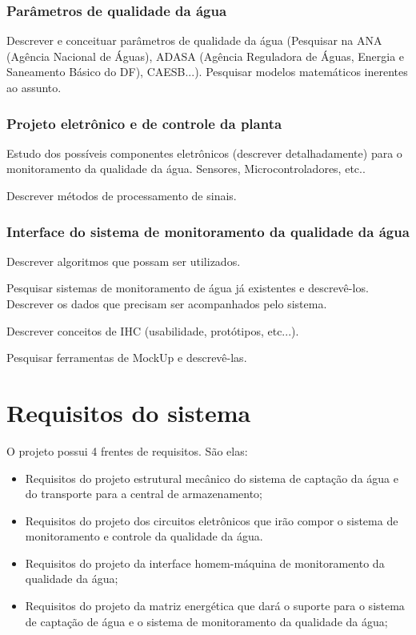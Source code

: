       \subsubsection{Parâmetros de qualidade da água}
      
      Descrever e conceituar parâmetros de qualidade da água
      (Pesquisar na ANA (Agência Nacional de Águas), ADASA (Agência Reguladora de Águas, Energia e Saneamento Básico do DF), CAESB...).
      Pesquisar modelos matemáticos inerentes ao assunto.
    
      \subsubsection{Projeto eletrônico e de controle da planta}
      
      Estudo dos possíveis componentes eletrônicos (descrever detalhadamente) para o monitoramento da qualidade da água.
	Sensores, Microcontroladores, etc..
	
      Descrever métodos de processamento de sinais.
      
      \subsubsection{Interface do sistema de monitoramento da qualidade da água}
      
      Descrever algoritmos que possam ser utilizados.
      
      Pesquisar sistemas de monitoramento de água já existentes e descrevê-los.
      Descrever os dados que precisam ser acompanhados pelo sistema.
      
      Descrever conceitos de IHC (usabilidade, protótipos, etc...).
      
      Pesquisar ferramentas de MockUp e descrevê-las.
    
  \section{Requisitos do sistema}
  
      O projeto possui 4 frentes de requisitos. São elas:
      
      \begin{itemize}
	\item Requisitos do projeto estrutural mecânico do sistema de captação da água e do transporte para a central de armazenamento;
	\item Requisitos do projeto dos circuitos eletrônicos que irão compor o sistema de monitoramento e controle da qualidade da água.
	\item Requisitos do projeto da interface homem-máquina de monitoramento da qualidade da água;
	\item Requisitos do projeto da matriz energética que dará o suporte para o sistema de captação de água e o sistema de monitoramento da qualidade da água;
      \end{itemize}
    
    
    
    